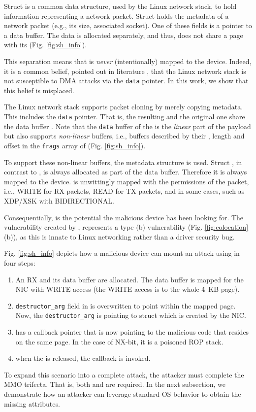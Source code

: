 Struct \skb{} is a common data structure, used by the Linux network stack, to hold information representing a network packet. Struct \skb{} holds the metadata of a network packet (e.g., its size, associated socket). One of these fields is a pointer to a data buffer. The data is allocated separately, and thus, does not share a page with its \skb{} (Fig. \ref{fig:sh_info}). 

This separation means that \skb{} is \emph{never} (intentionally) mapped to the device. Indeed, it is a common belief, pointed out in literature \cite{thunder}, that the Linux network stack is not susceptible to DMA attacks via the \texttt{data} pointer. In this work, we show that this belief is misplaced.

The Linux network stack supports packet cloning by merely copying \skb{} metadata. This includes the \texttt{data} pointer. That is, the resulting \skb{} and the original one share the data buffer \cite{drivers2005linux}. Note that the \texttt{data} buffer of the \skb{} is the \emph{linear} part of the payload but \skb{} also supports \emph{non-linear} buffers, i.e., buffers described by their \page{}, length and offset in the \texttt{frags} array of \shinfo{} (Fig. \ref{fig:sh_info}). 

To support these non-linear buffers, the \shinfo{} metadata structure is used.
Struct \shinfo{}, in contrast to \skb{}, is always allocated as part of the data buffer. Therefore it is always mapped to the device. \shinfo is unwittingly mapped with the permissions of the packet, i.e., WRITE for RX packets, READ for TX packets, and in some cases, such as XDP/XSK \cite{xdp} with BIDIRECTIONAL.

Consequentially, \shinfo{} is the potential \oportunity{} the malicious device has been looking for. The \subpage{} vulnerability created by \shinfo{}, represents a type (b) vulnerability (Fig. \ref{fig:colocation} (b)), as this is innate to Linux networking rather than a driver security bug. 

Fig. \ref{fig:sh_info} depicts how a malicious device can mount an attack using \shinfo{} in four steps:
\begin{enumerate}[label=(\alph*)]
    \item An RX \skb{} and its data buffer are allocated. The data buffer is mapped for the NIC with WRITE access (the WRITE access is to the whole 4~KB page). 
    \item \texttt{destructor\_arg} field in \shinfo{} is overwritten to point within the mapped page. Now, the \texttt{destructor\_arg} is pointing to struct \uarg{} which is created by the NIC.
    \item \uarg{} has a callback pointer that is now pointing to the malicious code that resides on the same page. In the case of NX-bit, it is a poisoned ROP stack.
    \item when the \skb{} is released, the callback is invoked.
\end{enumerate}
To expand this scenario into a complete attack, the attacker must complete the MMO trifecta. That is, both \means{} and \oportunity{} are required. In the next subsection, we demonstrate how an attacker can leverage standard OS behavior to obtain the missing attributes.


